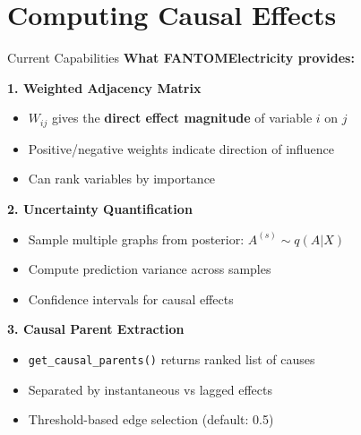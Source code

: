 \documentclass[aspectratio=169]{beamer}
\begin{document}
\section{Computing Causal Effects}

\begin{frame}{Current Capabilities}
\textbf{What FANTOMElectricity provides:}

\vspace{0.3cm}
\textbf{1. Weighted Adjacency Matrix}
\begin{itemize}
    \item $W_{ij}$ gives the \textbf{direct effect magnitude} of variable $i$ on $j$
    \item Positive/negative weights indicate direction of influence
    \item Can rank variables by importance
\end{itemize}

\vspace{0.3cm}
\textbf{2. Uncertainty Quantification}
\begin{itemize}
    \item Sample multiple graphs from posterior: $A^{(s)} \sim q(A | X)$
    \item Compute prediction variance across samples
    \item Confidence intervals for causal effects
\end{itemize}

\vspace{0.3cm}
\textbf{3. Causal Parent Extraction}
\begin{itemize}
    \item \texttt{get\_causal\_parents()} returns ranked list of causes
    \item Separated by instantaneous vs lagged effects
    \item Threshold-based edge selection (default: 0.5)
\end{itemize}
\end{frame}
\end{document}
